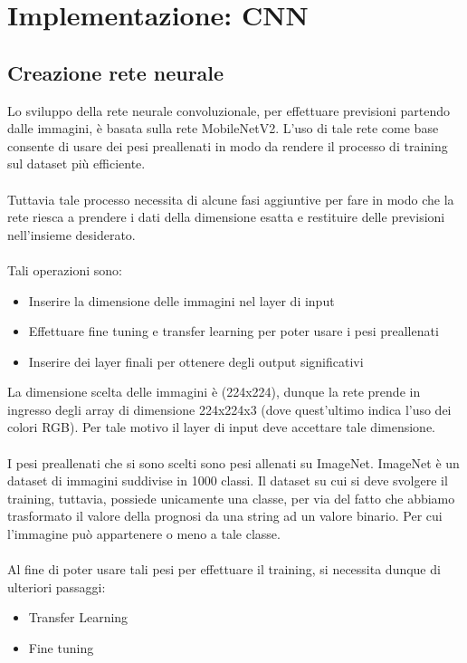 \chapter{Implementazione: CNN}
\label{ch:CNN}
\section{Creazione rete neurale}
Lo sviluppo della rete neurale convoluzionale, per effettuare previsioni partendo dalle immagini, è basata sulla rete 
MobileNetV2. L'uso di tale rete come base consente di usare dei pesi preallenati in modo da rendere il processo di training sul dataset più efficiente.
\\\\
Tuttavia tale processo necessita di alcune fasi aggiuntive per fare in modo che la rete riesca a prendere i dati della dimensione esatta 
e restituire delle previsioni nell'insieme desiderato.
\\\\
Tali operazioni sono:
\begin{itemize}
    \item Inserire la dimensione delle immagini nel layer di input
    \item Effettuare fine tuning e transfer learning per poter usare i pesi preallenati 
    \item Inserire dei layer finali per ottenere degli output significativi
\end{itemize}

La dimensione scelta delle immagini è (224x224), dunque la rete prende in ingresso degli array di dimensione 224x224x3 (dove quest'ultimo indica l'uso dei colori RGB).
Per tale motivo il layer di input deve accettare tale dimensione.
\\\\
I pesi preallenati che si sono scelti sono pesi allenati su ImageNet. ImageNet è un dataset di immagini suddivise in 1000 classi. Il dataset su cui si deve svolgere il training, tuttavia, possiede 
unicamente una classe, per via del fatto che abbiamo trasformato il valore della prognosi da una string ad un valore binario. 
Per cui l'immagine può appartenere o meno a tale classe.
\\\\
Al fine di poter usare tali pesi per effettuare il training, si necessita dunque di ulteriori passaggi: 
\begin{itemize}
    \item Transfer Learning
    \item Fine tuning
\end{itemize}

